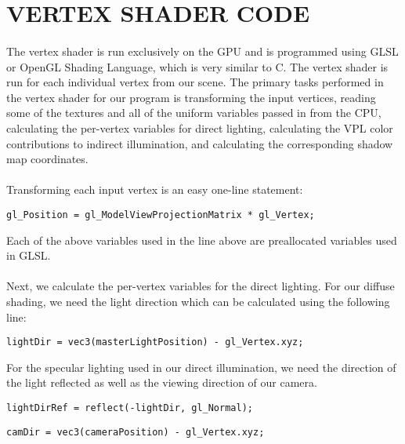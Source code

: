 \section{VERTEX SHADER CODE}
\paragraph{}
The vertex shader is run exclusively on the GPU and is programmed using GLSL or OpenGL Shading Language, which is very similar to C.  The vertex shader is run for each individual vertex from our scene.  The primary tasks performed in the vertex shader for our program is transforming the input vertices, reading some of the textures and all of the uniform variables passed in from the CPU, calculating the per-vertex variables for direct lighting, calculating the VPL color contributions to indirect illumination, and calculating the corresponding shadow map coordinates.

\paragraph{}
Transforming each input vertex is an easy one-line statement:

\begin{lstlisting}
gl_Position = gl_ModelViewProjectionMatrix * gl_Vertex;
\end{lstlisting}

Each of the above variables used in the line above are preallocated variables used in GLSL.

\paragraph{}
Next, we calculate the per-vertex variables for the direct lighting.  For our diffuse shading, we need the light direction which can be calculated using the following line:

\begin{lstlisting}
lightDir = vec3(masterLightPosition) - gl_Vertex.xyz;
\end{lstlisting}

For the specular lighting used in our direct illumination, we need the direction of the light reflected as well as the viewing direction of our camera.

\begin{lstlisting}
lightDirRef = reflect(-lightDir, gl_Normal);
\end{lstlisting}

\begin{lstlisting}
camDir = vec3(cameraPosition) - gl_Vertex.xyz;
\end{lstlisting}

